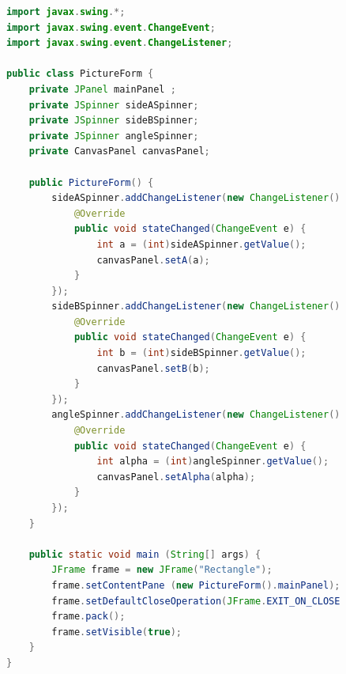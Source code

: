 \documentclass[a4paper, 14pt]{extarticle}
\begin{document}
\begin{figure}[!htb]
\begin{lstlisting}[language=Java,caption={Класс PictureForm},label={lst:pictureform}]
import javax.swing.*;
import javax.swing.event.ChangeEvent;
import javax.swing.event.ChangeListener;

public class PictureForm {
    private JPanel mainPanel ;
    private JSpinner sideASpinner;
    private JSpinner sideBSpinner;
    private JSpinner angleSpinner;
    private CanvasPanel canvasPanel;

    public PictureForm() {
        sideASpinner.addChangeListener(new ChangeListener() {
            @Override
            public void stateChanged(ChangeEvent e) {
                int a = (int)sideASpinner.getValue();
                canvasPanel.setA(a);
            }
        });
        sideBSpinner.addChangeListener(new ChangeListener() {
            @Override
            public void stateChanged(ChangeEvent e) {
                int b = (int)sideBSpinner.getValue();
                canvasPanel.setB(b);
            }
        });
        angleSpinner.addChangeListener(new ChangeListener() {
            @Override
            public void stateChanged(ChangeEvent e) {
                int alpha = (int)angleSpinner.getValue();
                canvasPanel.setAlpha(alpha);
            }
        });
    }

    public static void main (String[] args) {
        JFrame frame = new JFrame("Rectangle");
        frame.setContentPane (new PictureForm().mainPanel);
        frame.setDefaultCloseOperation(JFrame.EXIT_ON_CLOSE);
        frame.pack();
        frame.setVisible(true);
    }
}
\end{lstlisting}
\end{figure}
\end{document}
